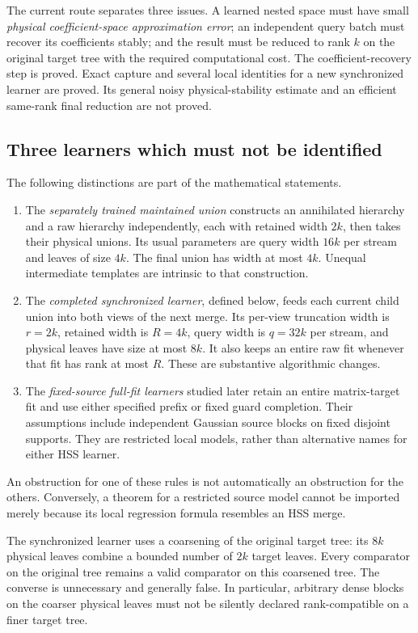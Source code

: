 \documentclass[11pt,oneside,openany,a4paper]{book}
\numberwithin{equation}{chapter}
\theoremstyle{definition}
\theoremstyle{remark}
\begin{document}
The current route separates three issues.  A learned nested space must
have small \emph{physical coefficient-space approximation error}; an
independent query batch must recover its coefficients stably; and the
result must be reduced to rank $k$ on the original target tree with the
required computational cost.  The coefficient-recovery step is proved.
Exact capture and several local identities for a new synchronized learner
are proved.  Its general noisy physical-stability estimate and an
efficient same-rank final reduction are not proved.

\subsection{Three learners which must not be identified}

The following distinctions are part of the mathematical statements.
\begin{enumerate}
 \item The \emph{separately trained maintained union} constructs an
 annihilated hierarchy and a raw hierarchy independently, each with
 retained width $2k$, then takes their physical unions.  Its usual
 parameters are query width $16k$ per stream and leaves of size $4k$.
 The final union has width at most $4k$.  Unequal intermediate templates
 are intrinsic to that construction.
 \item The \emph{completed synchronized learner}, defined below, feeds
 each current child union into both views of the next merge.  Its
 per-view truncation width is $r=2k$, retained width is $R=4k$, query
 width is $q=32k$ per stream, and physical leaves have size at most $8k$.
 It also keeps an entire raw fit whenever that fit has rank at most $R$.
 These are substantive algorithmic changes.
 \item The \emph{fixed-source full-fit learners} studied later retain
 an entire matrix-target fit and use either specified prefix or fixed
 guard completion.  Their assumptions include independent Gaussian
 source blocks on fixed disjoint supports.  They are restricted local
 models, rather than alternative names for either HSS learner.
\end{enumerate}
An obstruction for one of these rules is not automatically an
obstruction for the others.  Conversely, a theorem for a restricted
source model cannot be imported merely because its local regression
formula resembles an HSS merge.

The synchronized learner uses a coarsening of the original target tree:
its $8k$ physical leaves combine a bounded number of $2k$ target leaves.
Every comparator on the original tree remains a valid comparator on
this coarsened tree.  The converse is unnecessary and generally false.
In particular, arbitrary dense blocks on the coarser physical leaves
must not be silently declared rank-compatible on a finer target tree.
\end{document}
